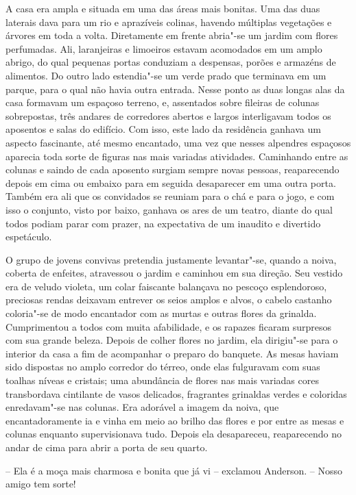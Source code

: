 A casa era ampla e situada em uma das áreas mais bonitas. Uma das duas
laterais dava para um rio e aprazíveis colinas, havendo múltiplas
vegetações e árvores em toda a volta. Diretamente em frente abria"-se um
jardim com flores perfumadas. Ali, laranjeiras e limoeiros estavam
acomodados em um amplo abrigo, do qual pequenas portas conduziam a
despensas, porões e armazéns de alimentos. Do outro lado estendia"-se um
verde prado que terminava em um parque, para o qual não havia outra
entrada. Nesse ponto as duas longas alas da casa formavam um espaçoso
terreno, e, assentados sobre fileiras de colunas sobrepostas, três
andares de corredores abertos e largos interligavam todos os aposentos
e salas do edifício. Com isso, este lado da \mbox{residência} ganhava um
aspecto fascinante, até mesmo encantado, uma vez que nesses alpendres
espaçosos aparecia toda sorte de figuras nas mais variadas atividades.
\mbox{Caminhando} entre as colunas e saindo de cada aposento surgiam sempre
novas pessoas, reaparecendo depois em cima ou embaixo para em seguida
desaparecer em uma outra porta. Também era ali que os convidados se
reuniam para o chá e para o jogo, e com isso o conjunto, visto por
baixo, ganhava os ares de um teatro, diante do qual todos podiam parar
com prazer, na expectativa de um inaudito e divertido espetáculo.

O grupo de jovens convivas pretendia justamente levantar"-se, quando a
noiva, coberta de enfeites, atravessou o jardim e caminhou em sua
direção. Seu vestido era de veludo violeta, um colar faiscante
balançava no pescoço esplendoroso, preciosas rendas deixavam entrever
os seios amplos e alvos, o cabelo castanho coloria"-se de modo
encantador com as murtas e outras flores da grinalda. Cumprimentou a
todos com muita afabilidade, e os rapazes ficaram surpresos com sua
grande beleza. Depois de colher flores no jardim, ela dirigiu"-se para o
interior da casa a fim de acompanhar o preparo do banquete. As mesas
haviam sido dispostas no amplo corredor do térreo, onde elas
fulguravam com suas toalhas níveas e cristais; uma abundância de flores
nas mais variadas cores transbordava cintilante de vasos delicados,
fragrantes grinaldas verdes e coloridas enredavam"-se nas colunas. Era
adorável a imagem da noiva, que encantadoramente ia e vinha em meio ao
brilho das flores e por entre as mesas e colunas enquanto
supervisionava tudo. Depois ela desapareceu, reaparecendo no andar de
cima para abrir a porta de seu quarto.

-- Ela é a moça mais charmosa e bonita que já vi -- exclamou
Anderson. -- Nosso amigo tem sorte!

